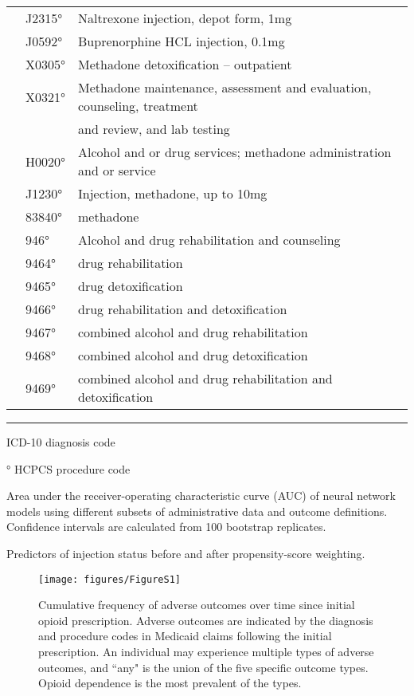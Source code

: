 \documentclass[9pt,twoside]{pnas-new}
\begin{document}
\begin{table}
\begin{tabular}{lll}
 & J2315° & Naltrexone injection, depot form, 1mg \\
 & J0592° & Buprenorphine HCL injection, 0.1mg \\
 & X0305° & Methadone detoxification – outpatient \\
 & X0321° & Methadone maintenance, assessment and evaluation, counseling, treatment \\
 &  & and review, and lab testing \\
 & H0020° & Alcohol and or drug services; methadone administration and or service \\
 & J1230° & Injection, methadone, up to 10mg \\
 & 83840° & methadone \\
 & 946° & Alcohol and drug rehabilitation and counseling \\
 & 9464° & drug rehabilitation \\
 & 9465° & drug detoxification \\
 & 9466° & drug rehabilitation and detoxification \\
 & 9467° & combined alcohol and drug rehabilitation \\
 & 9468° & combined alcohol and drug detoxification \\
 & 9469° & combined alcohol and drug rehabilitation and detoxification \\[1em]
\end{tabular}
\hrule
\begin{tablenotes}
\footnotesize
\item * ICD-10 diagnosis code
\item ° HCPCS procedure code
\end{tablenotes}
\end{table}

\begin{table}
\caption{Area under the receiver-operating characteristic curve (AUC) of neural network models using different subsets of administrative data and outcome definitions. Confidence intervals are calculated from 100 bootstrap replicates.}
\centering

\end{table}

\begin{table}
\caption{Predictors of injection status before and after propensity-score weighting.}
\centering

\end{table}

\begin{figure}
\caption{Cumulative frequency of adverse outcomes over time since initial opioid prescription. Adverse outcomes are indicated by the diagnosis and procedure codes in Medicaid claims following the initial prescription. An individual may experience multiple types of adverse outcomes, and ``any" is the union of the five specific outcome types. Opioid dependence is the most prevalent of the types.}
\centering
\texttt{[image: figures/FigureS1]}
\end{figure}
\end{document}
